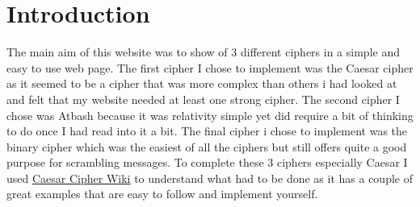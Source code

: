 \documentclass[10pt, a4paper]{article}
\title{\mytitle}
\author{\myauthor\hspace{1em}\\\contact\\Edinburgh Napier University\hspace{0.5em}-\hspace{0.5em}\mymodule}
\date{}
\begin{document}
	\maketitle

	
\section {Introduction}
The main aim of this website was to show of 3 different ciphers in a simple and easy to use web page. The first cipher I chose to implement was the Caesar cipher as it seemed to be a cipher that was more complex than others i had looked at and felt that my website needed at least one strong cipher. The second cipher I chose was Atbash because it was relativity simple yet did require a bit of thinking to do once I had read into it a bit. The final cipher i chose to implement was the binary cipher which was the easiest of all the ciphers but still offers quite a good purpose for scrambling messages. To complete these 3 ciphers especially Caesar I used \href{https://en.wikipedia.org/wiki/Caesar_cipher}{Caesar Cipher Wiki} to understand what had to be done as it has a couple of great examples that are easy to follow and implement yourself.
\end{document}
